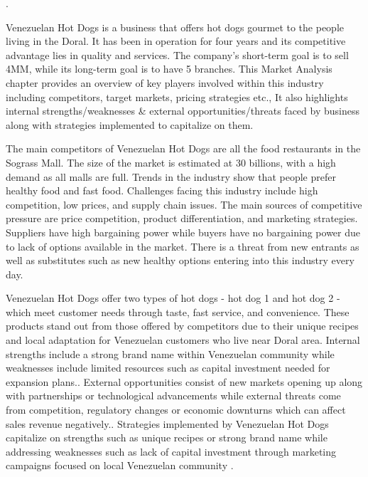 .

Venezuelan Hot Dogs is a business that offers hot dogs gourmet to the people living in the Doral. It has been in operation for four years and its competitive advantage lies in quality and services. The company's short-term goal is to sell 4MM, while its long-term goal is to have 5 branches. This Market Analysis chapter provides an overview of key players involved within this industry including competitors, target markets, pricing strategies etc., It also highlights internal strengths/weaknesses & external opportunities/threats faced by business along with strategies implemented to capitalize on them. 

The main competitors of Venezuelan Hot Dogs are all the food restaurants in the Sograss Mall. The size of the market is estimated at 30 billions, with a high demand as all malls are full. Trends in the industry show that people prefer healthy food and fast food. Challenges facing this industry include high competition, low prices, and supply chain issues. The main sources of competitive pressure are price competition, product differentiation, and marketing strategies. Suppliers have high bargaining power while buyers have no bargaining power due to lack of options available in the market. There is a threat from new entrants as well as substitutes such as new healthy options entering into this industry every day. 

Venezuelan Hot Dogs offer two types of hot dogs - hot dog 1 and hot dog 2 - which meet customer needs through taste, fast service, and convenience. These products stand out from those offered by competitors due to their unique recipes and local adaptation for Venezuelan customers who live near Doral area. Internal strengths include a strong brand name within Venezuelan community while weaknesses include limited resources such as capital investment needed for expansion plans.. External opportunities consist of new markets opening up along with partnerships or technological advancements while external threats come from competition, regulatory changes or economic downturns which can affect sales revenue negatively.. Strategies implemented by Venezuelan Hot Dogs capitalize on strengths such as unique recipes or strong brand name while addressing weaknesses such as lack of capital investment through marketing campaigns focused on local Venezuelan community . 

